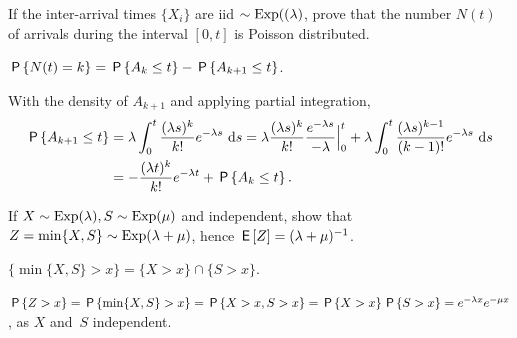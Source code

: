\documentclass[queueing-book.tex]{subfiles}
\begin{document}
\begin{exercise}\label{ex:l-213}
If the inter-arrival times $\{X_i\}$ are iid
 $\sim \Exp{(\lambda}$, prove that the number $N(t)$ of arrivals during the interval $[0,t]$ is Poisson distributed.
\begin{hint}
 $\P{N(t)=k} = \P{A_k \leq t} - \P{A_{k+1} \leq t}$.
\end{hint}
\begin{solution}
With  the density of $A_{k+1}$ and applying partial integration,
\begin{align*}
\P{A_{k+1} \leq t}
&= \lambda \int_0^t \frac{(\lambda s)^{k}}{k!}e^{-\lambda s}\, \d s
= \lambda \frac{(\lambda s)^{k}}{k!}\frac{e^{-\lambda s}}{-\lambda} \Big|_{0}^t + \lambda \int_0^t \frac{(\lambda s)^{k-1}}{(k-1)!}e^{-\lambda s}\, \d s \\
&= - \frac{(\lambda t)^{k}}{k!} e^{-\lambda t} + \P{A_k \leq t}.
\end{align*}
\end{solution}
\end{exercise}



\begin{exercise}\label{ex:10}
 If  $X\sim\Exp{\lambda}, S\sim\Exp{\mu}$ and
 independent, show that $Z=\min\{X,S\}\sim\Exp{\lambda+\mu}$,
hence $\E Z = (\lambda+\mu)^{-1}$.
\begin{hint}
$\{\min\{X, S\}>x\} =\{X>x\} \cap\{S> x\}$.
\end{hint}
\begin{solution}
$\P{Z>x} = \P{\min\{X,S\}>x} = \P{X>x, S> x} = \P{X>x}\P{S>x}  = e^{-\lambda x} e^{-\mu x}$, as  $X$ and~$S$ independent.
\end{solution}
\end{exercise}
\end{document}
